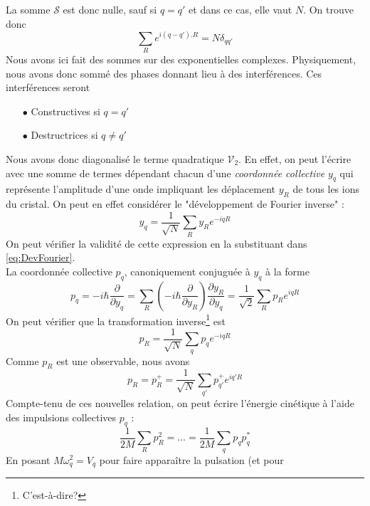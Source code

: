 La somme $\mathcal{S}$ est donc nulle, sauf si $q=q'$ et dans ce cas, elle vaut 
$N$. On trouve donc 
\begin{equation}
\sum_R e^{i(q-q').R} = N\delta_{qq'}
\end{equation}
Nous avons ici fait des sommes sur des exponentielles complexes. Physiquement, 
nous avons donc sommé des phases donnant lieu à des interférences. Ces 
interférences seront 
\begin{multicols}{2}
\begin{itemize}
\item[$\bullet$] Constructives si $q=q'$
\item[$\bullet$] Destructrices si $q\neq q'$
\end{itemize}
\end{multicols}
Nous avons donc diagonalisé le terme quadratique $\mathcal{V}_2$. En effet, on 
peut l'écrire avec une somme de termes dépendant chacun d'une \textit{coordonnée 
collective} $y_q$ qui représente l'amplitude d'une onde impliquant les déplacement 
$y_R$ de tous les ions du cristal. On peut en effet considérer le "développement 
de Fourier inverse" :
\begin{equation}
y_q = \frac{1}{\sqrt{N}}\sum_R y_Re^{-iqR}
\end{equation}
On peut vérifier la validité de cette expression en la substituant dans 
\autoref{eq:DevFourier}.\\
La coordonnée collective $p_q$, canoniquement conjuguée à $y_q$ à la forme
\begin{equation}
p_q = -i\hbar \dfrac{\partial}{\partial y_q} = \sum_R \left(-i\hbar\dfrac{
\partial}{\partial y_R}\right)\dfrac{\partial y_R}{\partial y_q} = \dfrac{1}{
\sqrt{2}}\sum_R p_R e^{iqR}
\end{equation}
On peut vérifier que la transformation inverse\footnote{C'est-à-dire?} est
\begin{equation}
p_R = \frac{1}{\sqrt{N}} \sum_q p_q e^{-iqR}
\end{equation}
Comme $p_R$ est une observable, nous avons
\begin{equation}
p_R = p_R^+ = \frac{1}{\sqrt{N}}\sum_{q'} p_{q'}^+ e^{iq'R}
\end{equation}
Compte-tenu de ces nouvelles relation, on peut écrire l'énergie cinétique 
à l'aide des impulsions collectives $p_q$ : 
\begin{equation}
\frac{1}{2M}\sum_R p_R^2 = \dots = \frac{1}{2M}\sum_q p_qp_q^*
\end{equation}
En posant $M\omega_q^2 = V_q$ pour faire apparaître la pulsation (et pour 
